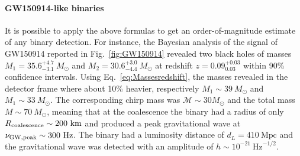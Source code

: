 \documentclass[a4paper,titlepage]{book}     	%
\newcommand{\sun}{\ensuremath{_\odot}}
\newcommand{\msun}{\ensuremath{M\sun}}
\begin{document}
\paragraph{GW150914-like binaries} It is possible to apply the above formulas to get an order-of-magnitude estimate of any binary detection. For instance, the Bayesian analysis of the signal of GW150914 reported in Fig.\ \ref{fig:GW150914} revealed two black holes of masses $M_1=35.6^{+4.7}_{-3.1} ~ \msun$ and $M_2=30.6^{+3.0}_{-4.4} ~ \msun$ at redshift $z=0.09^{+0.03}_{0.03}$ within 90\% confidence intervals. \cite{GWTC-1} Using Eq.\ \ref{eq:Massesredshift}, the masses revealed in the detector frame where about 10\% heavier, respectively $M_1 \sim 39 ~ \msun$ and $M_1 \sim 33 ~ \msun$. The corresponding chirp mass was $\mathcal{M} \sim 30 \msun$ and the total mass $M \sim 70 ~ \msun$, meaning that at the coalescence the binary had a radius of only $R_{\rm coalescence} \sim 200~\text{km}$ and produced a peak gravitational wave at $\nu_{\rm GW, peak} \sim 300 ~\text{Hz}$. The binary had a luminosity distance of $d_L=410~\text{Mpc}$ and the gravitational wave was detected with an amplitude of $h \sim 10^{-21}~ \text{Hz}^{-1/2}$.
\end{document}
